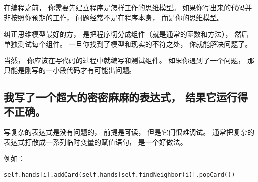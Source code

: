 
在编程之前， 你需要先建立程序是怎样工作的思维模型。  如果你写出来的代码并非按照你预期的工作， 问题经常不是在程序本身， 而是你的思维模型。  


纠正思维模型最好的方， 是把程序切分成组件（就是通常的函数和方法）， 然后单独测试每个组件。  
一旦你找到了模型和现实的不符之处， 你就能解决问题了。  


当然， 你应该在写代码的过程中就编写和测试组件。  如果你遇到了一个问题， 那只能是刚写的一小段代码才有可能出问题。  


\subsection{我写了一个超大的密密麻麻的表达式， 结果它运行得不正确。}



写复杂的表达式是没有问题的， 前提是可读， 但是它们很难调试。  通常把复杂的表达式打散成一系列临时变量的赋值语句， 是一个好做法。  


例如：

\begin{lstlisting}
self.hands[i].addCard(self.hands[self.findNeighbor(i)].popCard())
\end{lstlisting}

